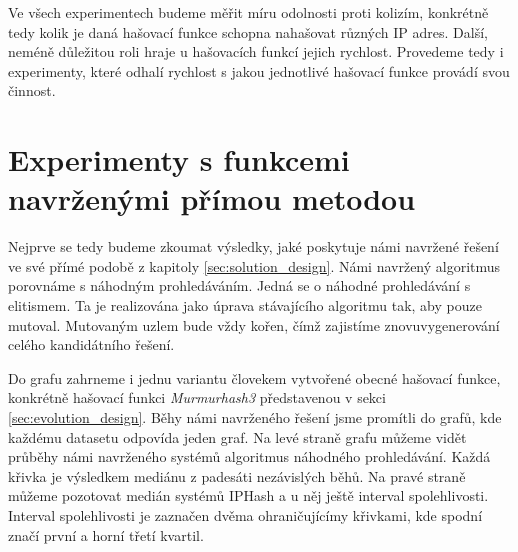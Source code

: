 Ve všech experimentech budeme měřit míru odolnosti proti kolizím, konkrétně tedy kolik je daná hašovací 
funkce schopna nahašovat různých IP adres. Další, neméně důležitou roli hraje u hašovacích funkcí jejich
rychlost. Provedeme tedy i experimenty, které odhalí rychlost s jakou jednotlivé hašovací funkce provádí svou
činnost. 

\section{Experimenty s funkcemi navrženými přímou metodou}
Nejprve se tedy budeme zkoumat výsledky, jaké poskytuje námi navržené řešení ve své přímé podobě z kapitoly
 \ref{sec:solution_design}. Námi navržený algoritmus porovnáme s náhodným prohledáváním.
 Jedná se o náhodné prohledávání s elitismem. Ta je realizována jako úprava stávajícího algoritmu tak, aby pouze mutoval.
 Mutovaným uzlem bude vždy kořen, čímž zajistíme znovuvygenerování celého kandidátního řešení.
 
 Do grafu zahrneme i jednu variantu človekem vytvořené obecné hašovací funkce, konkrétně hašovací funkci \textit{Murmurhash3} představenou
 v sekci \ref{sec:evolution_design}. Běhy námi navrženého řešení jsme promítli do grafů, kde každému
 datasetu odpovída jeden graf. Na levé straně grafu můžeme vidět průběhy námi navrženého systémů
 algoritmus náhodného prohledávání. Každá křivka je výsledkem mediánu z padesáti nezávislých běhů. Na pravé
 straně můžeme pozotovat medián systémů IPHash a u něj ještě interval spolehlivosti. Interval spolehlivosti
 je zaznačen dvěma ohraničujícímy křivkami, kde spodní značí první a horní třetí kvartil.

